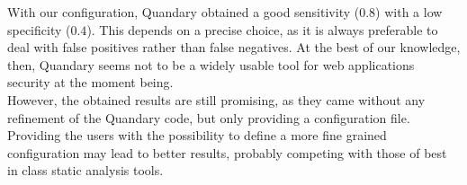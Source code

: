 \documentclass[../Report.tex]{subfiles}
\begin{document}
With our configuration, Quandary obtained a good sensitivity ($0.8$) with a low specificity ($0.4$). This depends on a precise choice, as it is always preferable to deal with false positives rather than false negatives. At the best of our knowledge, then, Quandary seems not to be a widely usable tool for web applications security at the moment being. \\
However, the obtained results are still promising, as they came without any refinement of the Quandary code, but only providing a configuration file. Providing the users with the possibility to define a more fine grained configuration may lead to better results, probably competing with those of best in class static analysis tools.
\end{document}
